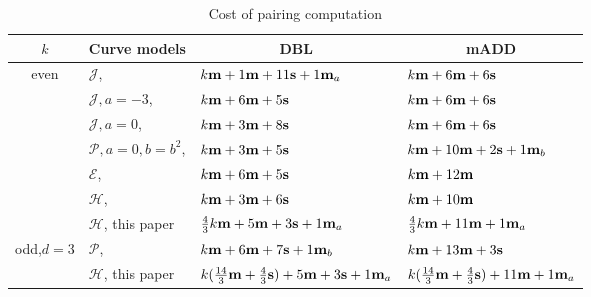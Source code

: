 \begin{table}[h]
\centering
\caption{Cost of pairing computation}

\begin{tabular}{ l | l | l | l}
\hline
\multicolumn{1}{c|}{$k$}
&\multicolumn{1}{c|}{Curve models}	&\multicolumn{1}{c|}{DBL}	&\multicolumn{1}{c}{mADD}	\\
\hline
\multicolumn{1}{c|}{\multirow{6}{*}{even}}
&$\mathcal{J}$, \cite{2008/IonicaJoux08} \cite{2009/fastertate}
				&$k\textbf{m} + 1\textbf{m} + 11\textbf{s} + 1\textbf{m}_{a}$	&$k\textbf{m} + 6\textbf{m} + 6\textbf{s}$	\\
&$\mathcal{J},a = -3$, \cite{2009/fastertate}
				&$k\textbf{m} + 6\textbf{m} + 5\textbf{s}$		&$k\textbf{m} + 6\textbf{m} + 6\textbf{s}$	\\
&$\mathcal{J},a = 0$, \cite{2009/fastertate}		
				&$k\textbf{m} + 3\textbf{m} + 8\textbf{s}$		&$k\textbf{m} + 6\textbf{m} + 6\textbf{s}$	\\
&$\mathcal{P},a = 0, b = b^2$, \cite{2009/craig}
				&$k\textbf{m} + 3\textbf{m} + 5\textbf{s}$		&$k\textbf{m} + 10\textbf{m} + 2\textbf{s} + 1\textbf{m}_{b}$	\\
&$\mathcal{E}$, \cite{2009/fastertate}			
				&$k\textbf{m} + 6\textbf{m} + 5\textbf{s}$		&$k\textbf{m} + 12\textbf{m}$	\\
&$\mathcal{H}$, \cite{2010/Gu}	&$k\textbf{m} + 3\textbf{m} + 6\textbf{s}$		&$k\textbf{m} + 10\textbf{m}$	\\
&$\mathcal{H}$, this paper
				&$\frac{4}{3}k\textbf{m} + 5\textbf{m} + 3\textbf{s} + 1\textbf{m}_a$
									&$\frac{4}{3}k\textbf{m} + 11\textbf{m} + 1\textbf{m}_a$	\\
\hline
\multicolumn{1}{c|}{\multirow{2}{*}{odd,$d{=}3$}}
&$\mathcal{P}$, \cite{2010/CLN}	&$k\textbf{m} + 6\textbf{m} + 7\textbf{s} + 1\textbf{m}_b$	&$k\textbf{m} + 13\textbf{m} + 3\textbf{s}$	\\
&$\mathcal{H}$, this paper
				&$k(\frac{14}{3}\textbf{m} + \frac{4}{3}\textbf{s}) + 5\textbf{m} + 3\textbf{s} + 1\textbf{m}_a$
									&$k(\frac{14}{3}\textbf{m} + \frac{4}{3}\textbf{s}) + 11\textbf{m} + 1\textbf{m}_a$	\\
\hline
\end{tabular}
\label{tbl-cmp}


\end{table}


